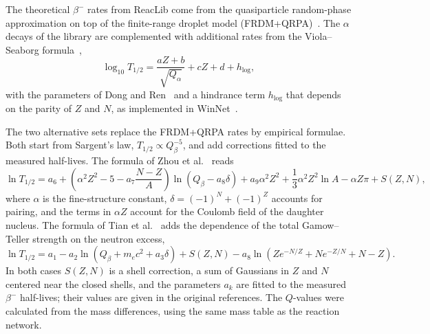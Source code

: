 \begin{table}[t]
\caption{Rate sets. Each set was run for the 512 trajectories. The last two columns give the number of $\beta^{-}$ and $\alpha$ decay rates. \label{tab:rate_sets}}\vspace{0.25em}
\end{table}

The theoretical $\beta^-$ rates from ReacLib come from the quasiparticle random-phase approximation on top of the finite-range droplet model (FRDM+QRPA)~\cite{moller_new_2003}.
The $\alpha$ decays of the library are complemented with additional rates from the Viola--Seaborg formula~\cite{viola_nuclear_1966},
\begin{equation}\label{eq:viola_seaborg}
  \log_{10}T_{1/2}=\frac{aZ+b}{\sqrt{Q_\alpha}}+cZ+d+h_{\log},
\end{equation}
with the parameters of Dong and Ren~\cite{dong_new_2005} and a hindrance term $h_{\log}$ that depends on the parity of $Z$ and $N$, as implemented in WinNet~\cite{reichert_nuclear_2023}.


The two alternative sets replace the FRDM+QRPA rates by empirical formulae.
Both start from Sargent's law, $T_{1/2}\propto Q_\beta^{-5}$, and add corrections fitted to the measured half-lives.
The formula of Zhou et al.~\cite{zhou_empirical_2017} reads
\begin{equation}\label{eq:zhou}
  \ln T_{1/2}=a_6+\left(\alpha^2Z^2-5-a_7\frac{N-Z}{A}\right)\ln\left(Q_\beta-a_8\delta\right)+a_9\alpha^2Z^2+\frac13\alpha^2Z^2\ln A-\alpha Z\pi+S(Z,N),
\end{equation}
where $\alpha$ is the fine-structure constant, $\delta=(-1)^N+(-1)^Z$ accounts for pairing, and the terms in $\alpha Z$ account for the Coulomb field of the daughter nucleus.
The formula of Tian et al.~\cite{tian_empirical_2025} adds the dependence of the total Gamow--Teller strength on the neutron excess,
\begin{equation}\label{eq:tian}
  \ln T_{1/2}=a_1-a_2\ln\left(Q_\beta+m_ec^2+a_3\delta\right)+S(Z,N)-a_8\ln\left(Ze^{-N/Z}+Ne^{-Z/N}+N-Z\right).
\end{equation}
In both cases $S(Z,N)$ is a shell correction, a sum of Gaussians in $Z$ and $N$ centered near the closed shells, and the parameters $a_k$ are fitted to the measured $\beta^-$ half-lives; their values are given in the original references.
The $Q$-values were calculated from the mass differences, using the same mass table as the reaction network.

